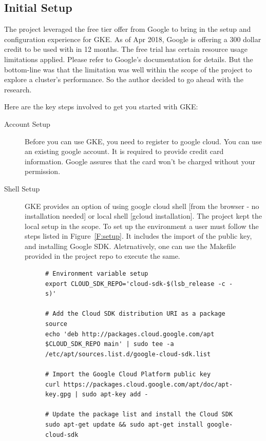 \subsection{Initial Setup}

The project leveraged the free tier offer from Google to bring in the setup
and configuration experience for GKE. As of Apr 2018, Google is offering a 300
dollar credit to be used with in 12 months. The free trial has certain
resource usage limitations applied. Please refer to Google's documentation for
details. But the bottom-line was that the limitation was well within the scope
of the project to explore a cluster's performance. So the author decided to go
ahead with the research.

Here are the key steps involved to get you started with GKE:

\begin{description}

\item[Account Setup] Before you can use GKE, you need to register to google
  cloud. You can use an existing google account. It is required to provide
  credit card information.  Google assures that the card won't be charged
  without your permission.

\item[Shell Setup] GKE provides an option of using google cloud shell [from
  the browser - no installation needed] or local shell [gcloud installation].
  The project kept the local setup in the scope. To set up the environment a
  user must follow the steps listed in Figure~\ref{F:setup}. It includes the
  import of the public key, and installing Google SDK. Aletrnatively, one can
  use the Makefile provided in the project repo to execute the same.

\begin{figure}[htb]
\begin{footnotesize}
\begin{verbatim}
# Environment variable setup
export CLOUD_SDK_REPO='cloud-sdk-$(lsb_release -c -s)'

# Add the Cloud SDK distribution URI as a package source
echo 'deb http://packages.cloud.google.com/apt $CLOUD_SDK_REPO main' | sudo tee -a /etc/apt/sources.list.d/google-cloud-sdk.list

# Import the Google Cloud Platform public key
curl https://packages.cloud.google.com/apt/doc/apt-key.gpg | sudo apt-key add -

# Update the package list and install the Cloud SDK
sudo apt-get update && sudo apt-get install google-cloud-sdk
\end{verbatim}


\end{footnotesize}
\end{figure}
\end{description}
